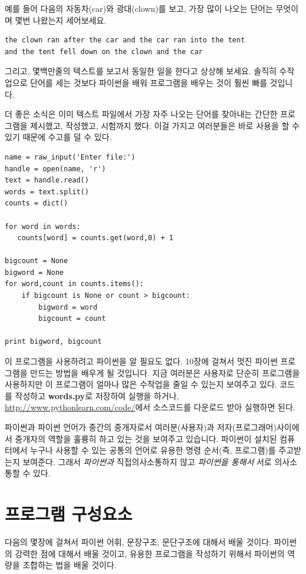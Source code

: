 예를 들어 다음의 자동차(car)와 광대(clown)를 보고, 가장 많이 나오는 단어는 무엇이며 몇번 나왔는지 세어보세요.

\beforeverb
\begin{verbatim}
the clown ran after the car and the car ran into the tent 
and the tent fell down on the clown and the car 
\end{verbatim}
\afterverb
%

그리고, 몇백만줄의 텍스트를 보고서 동일한 일을 한다고 상상해 보세요. 솔직히 수작업으로 단어를 세는 것보다 파이썬을 배워 프로그램을 배우는 것이 훨씬 빠를 것입니다.

더 좋은 소식은 이미 텍스트 파일에서 가장 자주 나오는 단어를 찾아내는 간단한 프로그램을 제시했고, 작성했고, 시험까지 했다. 이걸 가지고 여러분들은 바로 사용을 할 수 있기 때문에 수고를 덜 수 있다.

\beforeverb
\begin{verbatim}
name = raw_input('Enter file:')
handle = open(name, 'r')
text = handle.read()
words = text.split()
counts = dict()

for word in words:
   counts[word] = counts.get(word,0) + 1

bigcount = None
bigword = None
for word,count in counts.items():
    if bigcount is None or count > bigcount:
        bigword = word
        bigcount = count

print bigword, bigcount
\end{verbatim}
\afterverb
%
이 프로그램을 사용하려고 파이썬을 알 필요도 없다. 10장에 걸쳐서 멋진 파이썬 프로그램을 만드는 방법을 배우게 될 것입니다. 지금 여러분은 사용자로 단순히 프로그램을 사용하지만 이 프로그램이 얼마나 많은 수작업을 줄일 수 있는지 보여주고 있다. 코드를 작성하고 {\bf words.py}로 저장하여 실행을 하거나, \url{http://www.pythonlearn.com/code/}에서 소스코드를 다운로드 받아 실행하면 된다.

파이썬과 파이썬 언어가 중간의 중개자로서 여러분(사용자)과 저자(프로그래머)사이에서 중개자의 역할을 훌륭히 하고 있는 것을 보여주고 있습니다. 파이썬이 설치된 컴퓨터에서 누구나 사용할 수 있는 공통의 언어로 유용한 명령 순서(즉, 프로그램)를 주고받는지 보여준다. 그래서 {\em 파이썬과} 직접의사소통하지 않고 {\em 파이썬을 통해서} 서로 의사소통할 수 있다.

\section{프로그램 구성요소}

다음의 몇장에 걸쳐서 파이썬 어휘, 문장구조, 문단구조에 대해서 배울 것이다. 파이썬의 강력한 점에 대해서 배울 것이고, 유용한 프로그램을 작성하기 위해서 파이썬의 역량을 조합하는 법을 배울 것이다.


